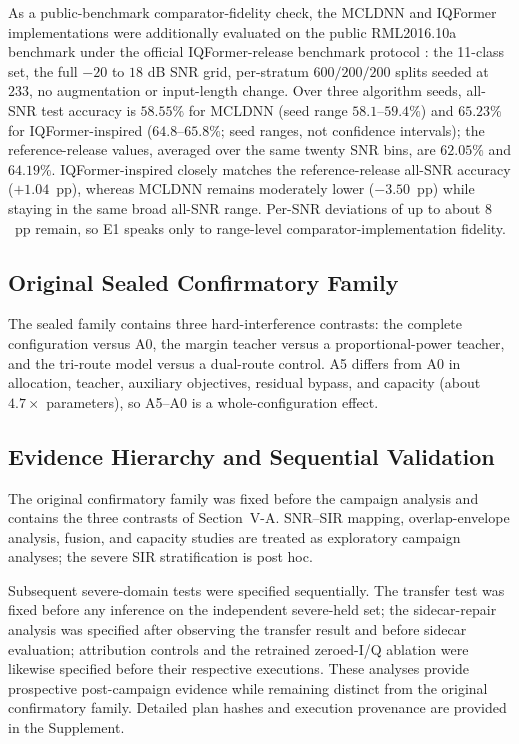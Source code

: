 \documentclass[letterpaper,journal]{IEEEtran}
\begin{document}
As a public-benchmark comparator-fidelity check, the MCLDNN and IQFormer
implementations were additionally evaluated on the public RML2016.10a benchmark
\cite{oshea2016cnn} under the official IQFormer-release benchmark protocol
\cite{shao2025iqformercode}: the 11-class set, the
full $-20$ to $18$ dB SNR grid, per-stratum $600/200/200$ splits seeded at
$233$, no augmentation or input-length change. Over three algorithm seeds,
all-SNR test accuracy is $58.55\%$ for MCLDNN (seed range
$58.1$--$59.4\%$) and $65.23\%$ for IQFormer-inspired ($64.8$--$65.8\%$;
seed ranges, not confidence intervals); the reference-release values,
averaged over the same twenty SNR bins, are $62.05\%$ and $64.19\%$.
IQFormer-inspired closely matches the
reference-release all-SNR accuracy ($+1.04$~pp), whereas MCLDNN remains
moderately lower ($-3.50$~pp) while staying in the same
broad all-SNR range. Per-SNR deviations of up to about $8$~pp remain, so E1
speaks only to range-level comparator-implementation fidelity.

\subsection{Original Sealed Confirmatory Family}
The sealed family contains three hard-interference contrasts: the complete
configuration versus A0, the margin teacher versus a proportional-power
teacher, and the tri-route model versus a dual-route control. A5 differs from
A0 in allocation, teacher, auxiliary objectives, residual bypass, and capacity
(about $4.7\times$ parameters), so A5--A0 is a whole-configuration
effect.

\subsection{Evidence Hierarchy and Sequential Validation}
The original confirmatory family was fixed before the campaign analysis and
contains the three contrasts of Section~V-A. SNR--SIR mapping,
overlap-envelope analysis, fusion, and capacity studies are treated as
exploratory campaign analyses; the severe SIR stratification is post hoc.

Subsequent severe-domain tests were specified sequentially. The transfer test
was fixed before any inference on the independent severe-held set; the
sidecar-repair analysis was specified after observing the transfer result and
before sidecar evaluation; attribution controls and the retrained zeroed-I/Q
ablation were likewise specified before their respective executions. These
analyses provide prospective post-campaign evidence while remaining distinct
from the original confirmatory family. Detailed plan hashes and execution
provenance are provided in the Supplement.
\end{document}
